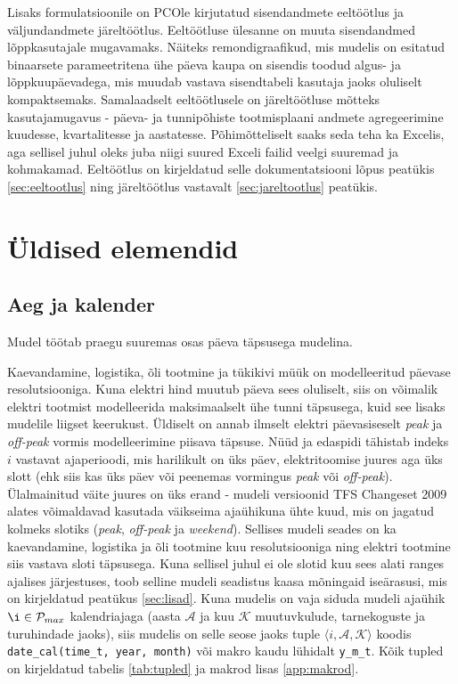 \documentclass[10pt,a4paper]{article}
\begin{document}
Lisaks formulatsioonile on PCOle kirjutatud sisendandmete eeltöötlus ja väljundandmete järeltöötlus. Eeltöötluse ülesanne on muuta sisendandmed lõpp\-kasutajale mugavamaks. Näiteks remondigraafikud, mis mudelis on esitatud binaarsete parameetritena ühe päeva kaupa on sisendis toodud algus- ja lõpp\-kuu\-päevadega, mis muudab vastava sisendtabeli kasutaja jaoks oluliselt kompaktsemaks. Samalaadselt eeltöötlusele on järeltöötluse mõtteks kasutajamugavus - päeva- ja tunnipõhiste tootmisplaani andmete agregeerimine kuudesse, kvartalitesse ja aastatesse. Põhimõtteliselt saaks seda teha ka Excelis, aga sellisel juhul oleks juba niigi suured Exceli failid veelgi suuremad ja kohmakamad. Eeltöötlus on kirjeldatud selle dokumentatsiooni lõpus peatükis \ref{sec:eeltootlus} ning järeltöötlus vastavalt \ref{sec:jareltootlus} peatükis.

\section{Üldised elemendid}
\subsection{Aeg ja kalender}
Mudel töötab praegu suuremas osas päeva täpsusega mudelina.

Kaevandamine, logistika, õli tootmine ja tükikivi müük on modelleeritud päevase resolutsiooniga. Kuna elektri hind muutub päeva sees oluliselt, siis on võimalik elektri tootmist modelleerida maksimaalselt ühe tunni täpsusega, kuid see lisaks mudelile liigset keerukust. Üldiselt on annab ilmselt elektri  päevasiseselt \emph{peak} ja \emph{off-peak} vormis modelleerimine piisava täpsuse. Nüüd ja edas\-pidi tähistab indeks $i$ vastavat ajaperioodi, mis harilikult on üks päev, elektritoomise juures aga üks slott (ehk siis kas üks päev või peenemas vormingus \emph{peak} või \emph{off-peak}).
Ülalmainitud väite juures on üks erand - mudeli versioonid TFS Changeset 2009 alates võimaldavad kasutada väikseima ajaühikuna  ühte kuud, mis on jagatud kolmeks slotiks (\emph{peak}, \emph{off-peak} ja \emph{weekend}). Sellises mudeli seades on ka kaevandamine, logistika ja õli tootmine kuu resolutsiooniga ning elektri tootmine siis vastava sloti täpsusega. Kuna sellisel juhul ei ole slotid kuu sees alati ranges ajalises järjestuses, toob selline mudeli seadistus kaasa mõningaid iseärasusi, mis on kirjeldatud peatükus \ref{sec:lisad}. Kuna mudelis on vaja siduda mudeli ajaühik $\i \in \mathcal{P}_{max}$ kalendriajaga (aasta $\mathcal{A}$ ja kuu $\mathcal{K}$ muutuvkulude, tarnekoguste ja turuhindade jaoks), siis mudelis on selle seose jaoks tuple $\langle i, \mathcal{A}, \mathcal{K} \rangle$ koodis \texttt{date\_cal(time\_t, year, month)} või makro kaudu lühidalt \texttt{y\_m\_t}. Kõik tupled on kirjeldatud tabelis \ref{tab:tupled} ja makrod lisas \ref{app:makrod}.
\end{document}

